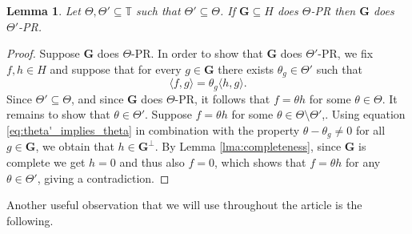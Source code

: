 \documentclass[reqno,a4paper,11pt]{amsart}
\numberwithin{equation}{section}
\newtheorem{lemma}[definition]{Lemma}
\def\T{{\mathbb T}}
\newcommand\1{\mathds{1}}
\begin{document}
\begin{lemma}\label{lemma:theta_pr_implies_theta'_pr}
Let $\Theta, \Theta' \subseteq \T$ such that $\Theta' \subseteq \Theta$. If $\mathbf{G} \subseteq H$ does $\Theta$-PR then $\mathbf{G}$ does $\Theta'$-PR.
\end{lemma}
\begin{proof}
    Suppose $\mathbf{G}$ does $\Theta$-PR. In order to show that $\mathbf{G}$ does $\Theta'$-PR, we fix $f,h\in H$ and suppose that for every $g\in\mathbf{G}$ there exists $\theta_g\in \Theta'$ such that
\begin{equation}\label{eq:theta'_implies_theta}
    \langle f,g\rangle =\theta_g \langle h,g\rangle.     
\end{equation}
Since $\Theta'\subseteq \Theta$, and since $\mathbf{G}$ does $\Theta$-PR, it follows that $f=\theta h$ for some $\theta \in \Theta$. It remains to show that $\theta \in \Theta'$. Suppose $f=\theta h$ for some $\theta \in \Theta \setminus \Theta'$,. Using equation \eqref{eq:theta'_implies_theta} in combination with the property $\theta - \theta_g \neq 0$ for all $g \in \mathbf{G}$, we obtain that $h \in \mathbf{G}^\perp$. By Lemma \ref{lma:completeness}, since $\mathbf{G}$ is complete we get $h = 0$ and thus also $f=0$, which shows that $f=\theta h$ for any $\theta \in \Theta'$, giving a contradiction.
\end{proof}

Another useful observation that we will use throughout the article is the following.
\end{document}
